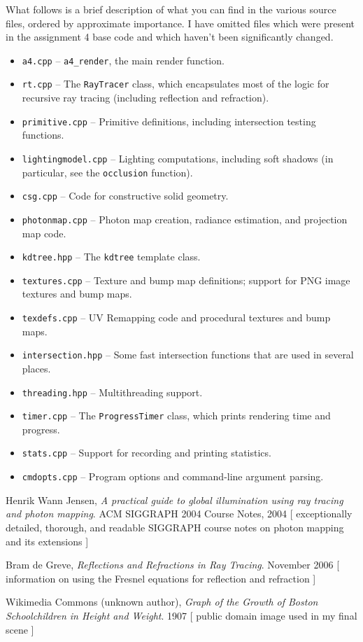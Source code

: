 \documentclass{article}
\begin{document}
What follows is a brief description of what you can find in the various source
files, ordered by approximate importance. I have omitted files which were
present in the assignment 4 base code and which haven't been significantly
changed.

\newcommand{\cmditem}[1]{\item {\tt #1}}

\begin{itemize}
    \cmditem{a4.cpp} -- {\tt a4\_render}, the main render function.
    \cmditem{rt.cpp} -- The {\tt RayTracer} class, which encapsulates most of
    the logic for recursive ray tracing (including reflection and refraction).
    \cmditem{primitive.cpp} -- Primitive definitions, including intersection
    testing functions.
    \cmditem{lightingmodel.cpp} -- Lighting computations, including soft shadows
    (in particular, see the {\tt occlusion} function).
    \cmditem{csg.cpp} -- Code for constructive solid geometry.
    \cmditem{photonmap.cpp} -- Photon map creation, radiance estimation, and
    projection map code.
    \cmditem{kdtree.hpp} -- The {\tt kdtree} template class.
    \cmditem{textures.cpp} -- Texture and bump map definitions; support for
    PNG image textures and bump maps.
    \cmditem{texdefs.cpp} -- UV Remapping code and procedural textures and bump
    maps.
    \cmditem{intersection.hpp} -- Some fast intersection functions that are used
    in several places.
    \cmditem{threading.hpp} -- Multithreading support.
    \cmditem{timer.cpp} -- The {\tt ProgressTimer} class, which prints rendering
    time and progress.
    \cmditem{stats.cpp} -- Support for recording and printing statistics.
    \cmditem{cmdopts.cpp} -- Program options and command-line argument parsing.
\end{itemize}

\begin{thebibliography}{9}

 Henrik Wann Jensen,
 \emph{A practical guide to global illumination using ray tracing and photon mapping}.
 ACM SIGGRAPH 2004 Course Notes, 2004 [ exceptionally detailed, thorough, and readable SIGGRAPH course notes on photon mapping and its extensions ]

Bram de Greve, \emph{Reflections and Refractions in Ray Tracing}. November 2006
[ information on using the Fresnel equations for reflection and refraction ]

  Wikimedia Commons (unknown author), \emph{Graph of the Growth of Boston Schoolchildren in Height and Weight}. 1907 [ public domain image used in my final scene ]

\end{thebibliography}
\end{document}
